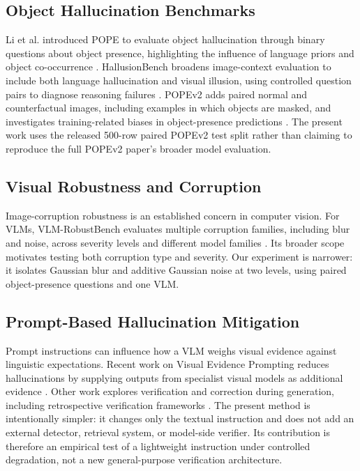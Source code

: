 \documentclass[conference]{IEEEtran}
\begin{document}
\subsection{Object Hallucination Benchmarks}
Li et al. introduced POPE to evaluate object hallucination through binary questions about object presence, highlighting the influence of language priors and object co-occurrence \cite{li2023pope}. HallusionBench broadens image-context evaluation to include both language hallucination and visual illusion, using controlled question pairs to diagnose reasoning failures \cite{guan2024hallusion}. POPEv2 adds paired normal and counterfactual images, including examples in which objects are masked, and investigates training-related biases in object-presence predictions \cite{li2026popev2}. The present work uses the released 500-row paired POPEv2 test split rather than claiming to reproduce the full POPEv2 paper's broader model evaluation.

\subsection{Visual Robustness and Corruption}
Image-corruption robustness is an established concern in computer vision. For VLMs, VLM-RobustBench evaluates multiple corruption families, including blur and noise, across severity levels and different model families \cite{saxena2026robustbench}. Its broader scope motivates testing both corruption type and severity. Our experiment is narrower: it isolates Gaussian blur and additive Gaussian noise at two levels, using paired object-presence questions and one VLM.

\subsection{Prompt-Based Hallucination Mitigation}
Prompt instructions can influence how a VLM weighs visual evidence against linguistic expectations. Recent work on Visual Evidence Prompting reduces hallucinations by supplying outputs from specialist visual models as additional evidence \cite{li2025vep}. Other work explores verification and correction during generation, including retrospective verification frameworks \cite{wu2025reverse}. The present method is intentionally simpler: it changes only the textual instruction and does not add an external detector, retrieval system, or model-side verifier. Its contribution is therefore an empirical test of a lightweight instruction under controlled degradation, not a new general-purpose verification architecture.
\end{document}
